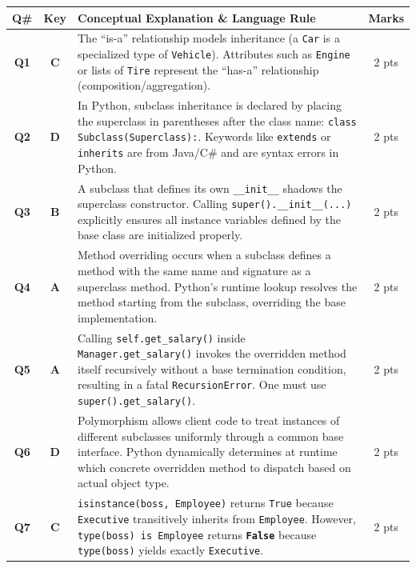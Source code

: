 \documentclass[11pt,a4paper]{article}
\begin{document}
\begin{center}
\renewcommand{\arraystretch}{1.20}
\small
\begin{tabularx}{\textwidth}{|c|c|X|c|}
\hline
\textbf{Q\#} & \textbf{Key} & \textbf{Conceptual Explanation \& Language Rule} & \textbf{Marks} \\
\hline
\textbf{Q1} & \textbf{C} & The ``is-a'' relationship models inheritance (a \texttt{Car} is a specialized type of \texttt{Vehicle}). Attributes such as \texttt{Engine} or lists of \texttt{Tire} represent the ``has-a'' relationship (composition/aggregation). & 2 pts \\
\hline
\textbf{Q2} & \textbf{D} & In Python, subclass inheritance is declared by placing the superclass in parentheses after the class name: \texttt{class Subclass(Superclass):}. Keywords like \texttt{extends} or \texttt{inherits} are from Java/C\# and are syntax errors in Python. & 2 pts \\
\hline
\textbf{Q3} & \textbf{B} & A subclass that defines its own \texttt{\_\_init\_\_} shadows the superclass constructor. Calling \texttt{super().\_\_init\_\_(...)} explicitly ensures all instance variables defined by the base class are initialized properly. & 2 pts \\
\hline
\textbf{Q4} & \textbf{A} & Method overriding occurs when a subclass defines a method with the same name and signature as a superclass method. Python's runtime lookup resolves the method starting from the subclass, overriding the base implementation. & 2 pts \\
\hline
\textbf{Q5} & \textbf{A} & Calling \texttt{self.get\_salary()} inside \texttt{Manager.get\_salary()} invokes the overridden method itself recursively without a base termination condition, resulting in a fatal \texttt{RecursionError}. One must use \texttt{super().get\_salary()}. & 2 pts \\
\hline
\textbf{Q6} & \textbf{D} & Polymorphism allows client code to treat instances of different subclasses uniformly through a common base interface. Python dynamically determines at runtime which concrete overridden method to dispatch based on actual object type. & 2 pts \\
\hline
\textbf{Q7} & \textbf{C} & \texttt{isinstance(boss, Employee)} returns \texttt{True} because \texttt{Executive} transitively inherits from \texttt{Employee}. However, \texttt{type(boss) is Employee} returns \textbf{\texttt{False}} because \texttt{type(boss)} yields exactly \texttt{Executive}. & 2 pts \\
\hline

\end{tabularx}
\end{center}
\end{document}
